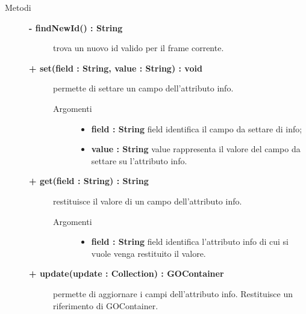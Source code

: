 \begin{description}
\item[Metodi] \hfill

\begin{description}
		\item[\textbf{\color{blue}- findNewId() : String			}] \hfill
			trova un nuovo id valido per il frame corrente.

\end{description}

	\begin{description}
		\item[\textbf{\color{blue}+ set(field : String, value : String) : void			}] \hfill
			permette di settare un campo dell'attributo info.
			
		\begin{description}
			\item[Argomenti] \hfill
				\begin{itemize}
				
					\item \textbf{field : String			} \hfill
					field identifica il campo da settare di info;
					\item \textbf{value : String			} \hfill
					value rappresenta il valore del campo da settare su l'attributo info.
				\end{itemize}
		\end{description}

\end{description}

\begin{description}
		\item[\textbf{\color{blue}+ get(field : String) : String			}] \hfill
			restituisce il valore di un campo dell'attributo info.
			
		\begin{description}
			\item[Argomenti] \hfill
				\begin{itemize}
				
					\item \textbf{field : String			} \hfill
					field identifica l'attributo info di cui si vuole venga restituito il valore.
				\end{itemize}
		\end{description}

\end{description}

\begin{description}
		\item[\textbf{\color{blue}+ update(update : Collection) : GOContainer			}] \hfill
			permette di aggiornare i campi dell'attributo info. Restituisce un riferimento di GOContainer.
			

\end{description}
\end{description}
